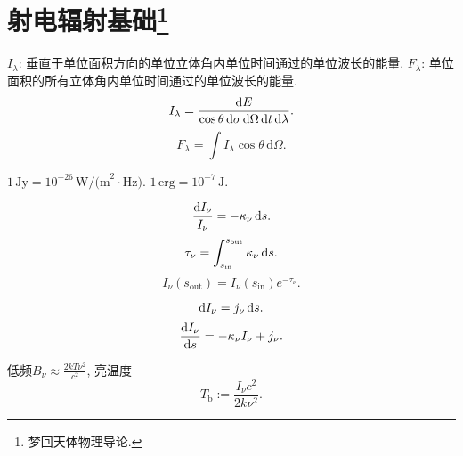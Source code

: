 \chapter[射电辐射基础]{射电辐射基础\footnote{梦回天体物理导论.}}

$I_\lambda$: 垂直于单位面积方向的单位立体角内单位时间通过的单位波长的能量. 
$F_\lambda$: 单位面积的所有立体角内单位时间通过的单位波长的能量.
\begin{equation}
    I_\lambda=\frac{\mathrm{d} E}{\cos\theta\,\mathrm{d}\sigma\,\mathrm{d}\Omega\,\mathrm{d} t\,\mathrm{d}\lambda}.
\end{equation}
\begin{equation}
    F_\lambda = \int I_\lambda \cos\theta \,\mathrm{d}\Omega.
\end{equation}

$1\,\text{Jy}=10^{-26}\,\text{W/(m}^2\!\cdot\text{Hz)}$. $1\,\text{erg}=10^{-7}\,\text{J}$.

\begin{equation}
    \frac{\mathrm{d} I_\nu}{I_\nu}=-\kappa_\nu\,\mathrm{d} s.
\end{equation}
\begin{equation}
    \tau_\nu=\int_{s_\text{in}}^{s_\text{out}}\kappa_\nu\,\mathrm{d} s.
\end{equation}
\begin{equation}
    I_\nu(s_\text{out})=I_\nu(s_\text{in})e^{-\tau_\nu}.
\end{equation}

\begin{equation}
    \mathrm{d} I_\nu=j_\nu\,\mathrm{d} s.
\end{equation}
\begin{equation}
    \frac{\mathrm{d} I_\nu}{\mathrm{d} s}=-\kappa_\nu I_\nu+j_\nu.
\end{equation}

低频$B_\nu\approx\frac{2kT\nu^2}{c^2}$, 亮温度
\begin{equation}
    T_\text{b}:=\frac{I_\nu c^2}{2k\nu^2}.
\end{equation}
